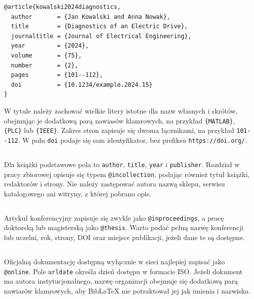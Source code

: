 \begin{lstlisting}[style=thesis,caption={Przykładowy rekord artykułu naukowego z numerem DOI},label={lst:bib-artykul}]
@article{kowalski2024diagnostics,
  author       = {Jan Kowalski and Anna Nowak},
  title        = {Diagnostics of an Electric Drive},
  journaltitle = {Journal of Electrical Engineering},
  year         = {2024},
  volume       = {75},
  number       = {2},
  pages        = {101--112},
  doi          = {10.1234/example.2024.15}
}
\end{lstlisting}

W tytule należy zachować wielkie litery istotne dla nazw własnych i skrótów, obejmując je dodatkową parą nawiasów klamrowych, na przykład \verb|{MATLAB}|, \verb|{PLC}| lub \verb|{IEEE}|. Zakres stron zapisuje się dwoma łącznikami, na przykład \verb|101--112|. W polu \texttt{doi} podaje się sam identyfikator, bez prefiksu \texttt{https://doi.org/}.

\subsection{}

Dla książki podstawowe pola to \texttt{author}, \texttt{title}, \texttt{year} i \texttt{publisher}. Rozdział w pracy zbiorowej opisuje się typem \texttt{@incollection}, podając również tytuł książki, redaktorów i strony. Nie należy zastępować autora nazwą sklepu, serwisu katalogowego ani witryny, z której pobrano opis.

\subsection{}

Artykuł konferencyjny zapisuje się zwykle jako \texttt{@inproceedings}, a pracę doktorską lub magisterską jako \texttt{@thesis}. Warto podać pełną nazwę konferencji lub uczelni, rok, strony, DOI oraz miejsce publikacji, jeżeli dane te są dostępne.

\subsection{}

Oficjalną dokumentację dostępną wyłącznie w sieci najlepiej zapisać jako \texttt{@online}. Pole \texttt{urldate} określa dzień dostępu w formacie ISO. Jeżeli dokument ma autora instytucjonalnego, nazwę organizacji obejmuje się dodatkową parą nawiasów klamrowych, aby BibLaTeX nie potraktował jej jak imienia i nazwiska.

